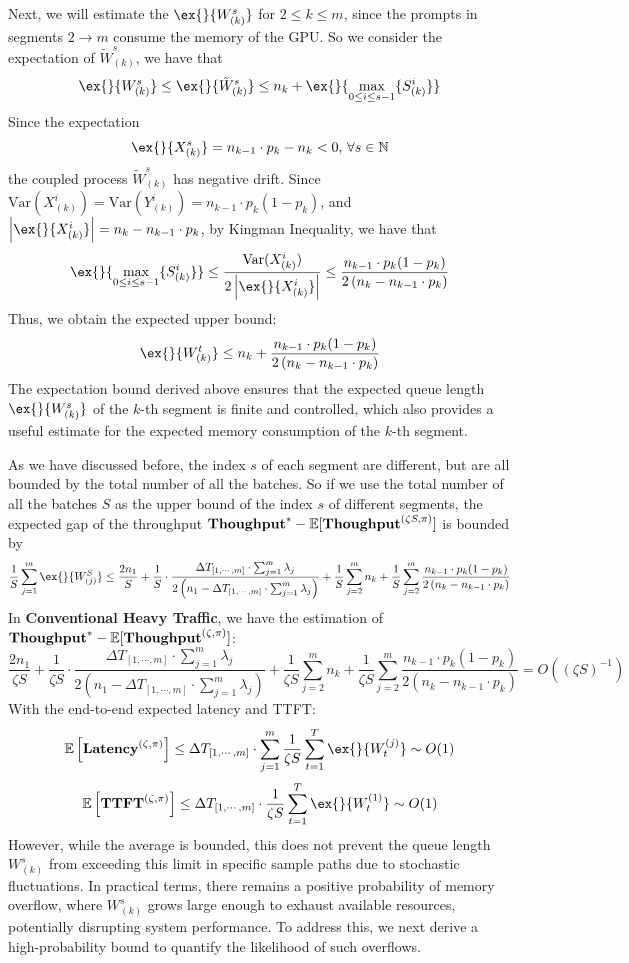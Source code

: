 Next, we will estimate the $\ex{}{W^{s}_{(k)}}$ for $2\leq k\leq m$, since the prompts in segments $2\to m$ consume the memory of the GPU. So we consider the expectation of $\tilde{W}^s_{(k)}$, we have that 
$$\ex{}{W^s_{(k)}}\leq \ex{}{\tilde{W}^s_{(k)}}\leq n_k+\ex{}{\max_{0\leq i\leq s-1}\{S^i_{(k)}\}} $$
Since the expectation
$$\ex{}{X^s_{(k)}} =  n_{k-1}\cdot p_k - n_{k}<0 ,\,\forall s\in \mathbb{N}$$
the coupled process $\tilde{W}^s_{(k)}$ has negative drift. Since $\text{Var}(X^i_{(k)})=\text{Var}(Y^i_{(k)})=n_{k-1}\cdot p_k(1-p_k)$, and $\left|\ex{}{X^i_{(k)}}\right|= n_{k}-n_{k-1}\cdot p_k$, by Kingman Inequality, we have that
$$\ex{}{\max_{0\leq i\leq s-1}\{S^i_{(k)}\}}  \leq  \frac{\text{Var}(X^i_{(k)})}{ 2\left|\ex{}{X^i_{(k)}}\right| }\leq   \frac{n_{k-1}\cdot p_k(1-p_k)}{2\left(n_{k}-n_{k-1}\cdot p_k\right)}$$
Thus, we obtain the expected upper bound:
$$\ex{}{W^t_{(k)}}\leq n_k +\frac{n_{k-1}\cdot p_k(1-p_k)}{2\left(n_{k}-n_{k-1}\cdot p_k\right)}$$
The expectation bound derived above ensures that the expected queue length $\ex{}{W^s_{(k)}}$ of the $k$-th segment is finite and controlled, which also provides a useful estimate for the expected memory consumption of the $k$-th segment. 

As we have discussed before, the index $s$ of each segment are different, but are all bounded by the total number of all the batches. So if we use the total number of all the batches $S$ as the upper bound of the index $s$ of different segments, the expected gap of the throughput $\textbf{Thoughput}^* - \mathbb{E}[\textbf{Thoughput}^{(\zeta S, \pi)}]$ is bounded by
$$\frac{1}{S}\sum_{j=1}^m \ex{}{W^S_{(j)}}\leq
\frac{2n_1}{S} +\frac{1}{S} \cdot\frac{\Delta T_{ [1,\cdots,m] }\cdot \sum_{j=1}^m \lambda_j}{2\left( n_1 - \Delta T_{ [1,\cdots,m] }\cdot \sum_{j=1}^m \lambda_j\right)} +\frac{1}{S}\sum_{j=2}^m n_k +\frac{1}{S}\sum_{j=2}^m\frac{n_{k-1}\cdot p_k(1-p_k)}{2\left(n_{k}-n_{k-1}\cdot p_k\right)}$$
In \textbf{Conventional Heavy Traffic}, we have the estimation of $\textbf{Thoughput}^* - \mathbb{E}[\textbf{Thoughput}^{(\zeta , \pi)}]$:
$$\frac{2n_1}{\zeta S} +\frac{1}{\zeta S} \cdot\frac{\Delta T_{ [1,\cdots,m] }\cdot \sum_{j=1}^m \lambda_j}{2\left( n_1 - \Delta T_{ [1,\cdots,m] }\cdot \sum_{j=1}^m \lambda_j\right)}+\frac{1}{\zeta S}\sum_{j=2}^m n_k +\frac{1}{\zeta S}\sum_{j=2}^m\frac{n_{k-1}\cdot p_k(1-p_k)}{2\left(n_{k}-n_{k-1}\cdot p_k\right)} = O((\zeta S)^{-1})$$
With the end-to-end expected latency and TTFT:
$$\mathbb{E}\left[ \Latency^{(\zeta , \pi)} \right]\leq \Delta T_{[1,\cdots,m]}\cdot \sum_{j=1}^m \frac{1}{\zeta S}\sum_{t=1}^T\ex{}{W_t^{(j)}} \sim O(1)$$
$$\mathbb{E}\left[ \TTFT^{(\zeta , \pi)} \right]\leq \Delta T_{[1,\cdots,m]}\cdot \frac{1}{\zeta S}\sum_{t=1}^T\ex{}{W_t^{(1)}} \sim O(1)$$
However, while the average is bounded, this does not prevent the queue length $W^s_{(k)}$ from exceeding this limit in specific sample paths due to stochastic fluctuations. In practical terms, there remains a positive probability of memory overflow, where $W^s_{(k)}$ grows large enough to exhaust available resources, potentially disrupting system performance. To address this, we next derive a high-probability bound to quantify the likelihood of such overflows.


